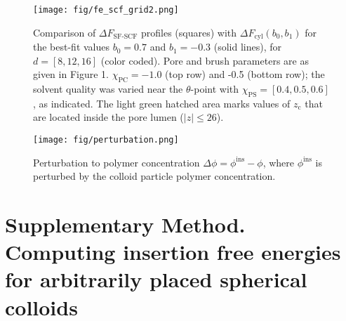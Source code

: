 \documentclass[10pt, a4paper]{article}
\begin{document}
\begin{multicols}{2}
\begin{figure}[H]
    \centering
    \texttt{[image: fig/fe\_scf\_grid2.png]}
    \caption{ 
    Comparison of $\Delta F_{\text{SF-SCF}}$ profiles (squares) with $\Delta F_{\text{cyl}}(b_0,b_1)$ for the best-fit values $b_0 = 0.7$ and $b_1 = -0.3$ (solid lines), for $d = [8, 12, 16]$ (color coded).
    Pore and brush parameters are as given in Figure 1. $\chi_{\text{PC}} = -1.0$ (top row) and -0.5 (bottom row); the solvent quality was varied near the $\theta$-point with $\chi_{\text{PS}} = [0.4, 0.5, 0.6]$, as indicated.
    The light green hatched area marks values of $z_{\text{c}}$ that are located inside the pore lumen ($|z| \leq 26$).
    \label{fig:fe_scf_grid}
    }
\end{figure}

\begin{figure}[H]
    \centering
    \texttt{[image: fig/perturbation.png]}
    \caption{ 
    Perturbation to polymer concentration $\Delta\phi = \phi^{\text{ins}} - \phi$, where $\phi^{\text{ins}}$ is perturbed by the colloid particle polymer concentration.
    \label{fig:perturbation}
    }
\end{figure}

\end{multicols}

\section{Supplementary Method. Computing insertion free energies for arbitrarily placed spherical colloids}
\end{document}
